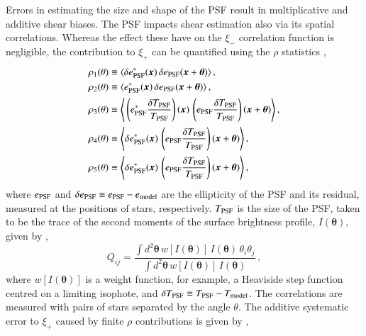 \documentclass{aa}
\begin{document}
	
	Errors in estimating the size and shape of the PSF result in multiplicative and additive shear biases. The PSF impacts shear estimation also via its spatial correlations. Whereas the effect these have on the $\xi_-$ correlation function is negligible, the contribution to $\xi_+$ can be quantified using the $\rho$ statistics \citep{Rowe_2010, Jarvis_etal_2016}, 
	\begin{equation}
	\begin{split}
	\rho_1(\theta) & \equiv \langle \delta e_{\rm PSF}^*(\boldsymbol{x}) \, \delta e_{\rm PSF}(\boldsymbol{x}+\boldsymbol{\theta}) \rangle \,, \\
	\rho_2(\theta) & \equiv \langle e_{\rm PSF}^*(\boldsymbol{x}) \, \delta e_{\rm PSF}(\boldsymbol{x}+\boldsymbol{\theta}) \rangle \,, \\
	\rho_3(\theta) & \equiv \Bigg\langle \left( e_{\rm PSF}^* \frac{\delta T_{\rm PSF}}{T_{\rm PSF}} \right)   (\boldsymbol{x}) \, \left( e_{\rm PSF} \frac{\delta T_{\rm PSF}}{T_{\rm PSF}} \right)(\boldsymbol{x}+\boldsymbol{\theta}) \Bigg\rangle \,, \\	
	\rho_4(\theta) & \equiv \Bigg\langle \delta e_{\rm PSF}^* (\boldsymbol{x}) \, \left( e_{\rm PSF} \frac{\delta T_{\rm PSF}}{T_{\rm PSF}} \right)(\boldsymbol{x}+\boldsymbol{\theta}) \Bigg\rangle \,, \\	
	\rho_5(\theta) & \equiv \Bigg\langle \delta e_{\rm PSF}^* (\boldsymbol{x}) \, \left( e_{\rm PSF} \frac{\delta T_{\rm PSF}}{T_{\rm PSF}} \right)(\boldsymbol{x}+\boldsymbol{\theta}) \Bigg\rangle \,, \\	
	\end{split}
	\label{eqn:RhoStats}
	\end{equation}
	where $e_{\rm PSF}$ and $\delta e_{\rm PSF} \equiv e_{\rm PSF} - e_{\rm model}$ are the ellipticity of the PSF and its residual, measured at the positions of stars, respectively. $T_{\rm PSF}$ is the size of the PSF, taken to be the trace of the second moments of the surface brightness profile, $I(\boldsymbol{\theta})$, given by \citep{Bartelmann_Schneider_2001},
\begin{equation}
Q_{ij} = \frac{\int d^2\boldsymbol{\theta} \, w[I(\boldsymbol{\theta})] \, I(\boldsymbol{\theta}) \, \theta_i\theta_j }{ \int d^2\boldsymbol{\theta} \, w[I(\boldsymbol{\theta})] \, I(\boldsymbol{\theta}) } \,,
\label{eqn:Moment_Brightness_Profile}
\end{equation} 
where $w[I(\boldsymbol{\theta})]$ is a weight function, for example, a Heaviside step function centred on a limiting isophote, and $\delta T_{\rm PSF} \equiv T_{\rm PSF} - T_{\rm model}$. The correlations are measured with pairs of stars separated by the angle $\theta$. The additive systematic error to $\xi_+$ caused by finite $\rho$ contributions is given by \citep{Jarvis_etal_2016},
\end{document}
